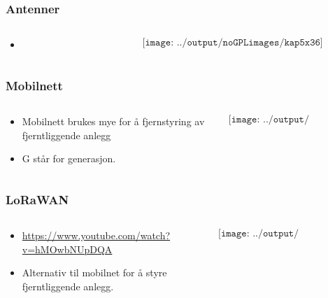 \documentclass[aspectratio=169,xcolor=dvipsnames]{beamer}
\begin{document}
\begin{frame}
	\frametitle{Antenner}
	\begin{columns}
		\begin{column}{0.5\textwidth}

			\begin{itemize}
				\item      
			\end{itemize}

			
		\end{column}

		\begin{column}{0.5\textwidth}
	$$\texttt{[image: ../output/noGPLimages/kap5x36]}$$
		\end{column}
	\end{columns}
\end{frame}
\begin{frame}
	\frametitle{Mobilnett}
	\begin{columns}
		\begin{column}{0.5\textwidth}

			\begin{itemize}
				\item Mobilnett brukes mye for å fjernstyring av fjerntliggende anlegg
				\item G står for generasjon. 

			\end{itemize}

			
		\end{column}

		\begin{column}{0.5\textwidth}
	$$\texttt{[image: ../output/noGPLimages/kap5x37]}$$
		\end{column}
	\end{columns}
\end{frame}
\begin{frame}
	\frametitle{LoRaWAN}
	\begin{columns}
		\begin{column}{0.5\textwidth}

			\begin{itemize}
				\item \url{https://www.youtube.com/watch?v=hMOwbNUpDQA}     
				\item Alternativ til mobilnet for å styre fjerntliggende anlegg. 
			\end{itemize}

			
		\end{column}

		\begin{column}{0.5\textwidth}
	$$\texttt{[image: ../output/noGPLimages/kap5x38]}$$
		\end{column}
	\end{columns}
\end{frame}
\end{document}
